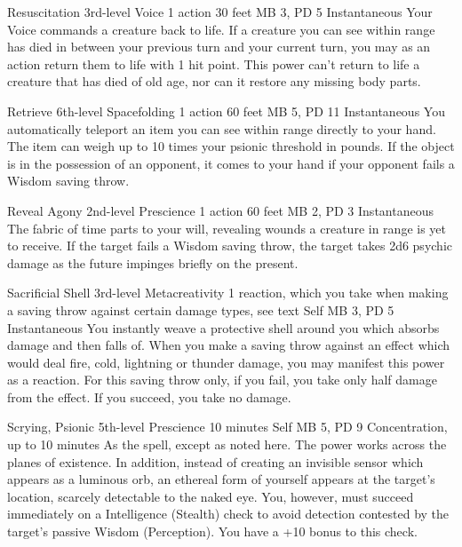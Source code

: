 \DndPowerHeader%
  {Resuscitation}
  {3rd-level Voice}
  {1 action}
  {30 feet}
  {MB 3, PD 5}
  {Instantaneous}
Your Voice commands a creature back to life.
If a creature you can see within range
has died in between your previous turn
and your current turn,
you may as an action return them to life
with 1 hit point.
This power can't return to life a creature
that has died of old age,
nor can it restore any missing body parts.

\DndPowerHeader%
  {Retrieve}
  {6th-level Spacefolding}
  {1 action}
  {60 feet}
  {MB 5, PD 11}
  {Instantaneous}
  You automatically teleport an item you can see within range
  directly to your hand.
  The item can weigh up to
  10 times your psionic threshold in pounds.
  If the object is in the possession of an opponent,
  it comes to your hand if your opponent
  fails a Wisdom saving throw.

\DndPowerHeader%
  {Reveal Agony}
  {2nd-level Prescience}
  {1 action}
  {60 feet}
  {MB 2, PD 3}
  {Instantaneous}
  The fabric of time parts to your will,
  revealing wounds a creature in range is yet to receive.
  If the target fails a Wisdom saving throw,
  the target takes 2d6 psychic damage as the future
  impinges briefly on the present.

\DndPowerHeader%
  {Sacrificial Shell}
  {3rd-level Metacreativity}
  {1 reaction, which you take when making a saving throw
    against certain damage types, see text}
  {Self}
  {MB 3, PD 5}
  {Instantaneous}
You instantly weave a protective shell around you
which absorbs damage and then falls of.
When you make a saving throw against an effect
which would deal fire, cold, lightning or thunder damage,
you may manifest this power as a reaction.
For this saving throw only,
if you fail, you take only half damage from the effect.
If you succeed, you take no damage.

\DndPowerHeader%
  {Scrying, Psionic}
  {5th-level Prescience}
  {10 minutes}
  {Self}
  {MB 5, PD 9}
  {Concentration, up to 10 minutes}
As the  spell, except as noted here.
The power works across the planes of existence.
In addition,
instead of creating an invisible sensor which appears
as a luminous orb,
an ethereal form of yourself appears at the target's location,
scarcely detectable to the naked eye.
You,
however,
must succeed immediately on a Intelligence (Stealth) check
to avoid detection contested by the target's passive
Wisdom (Perception).
You have a +10 bonus to this check.

